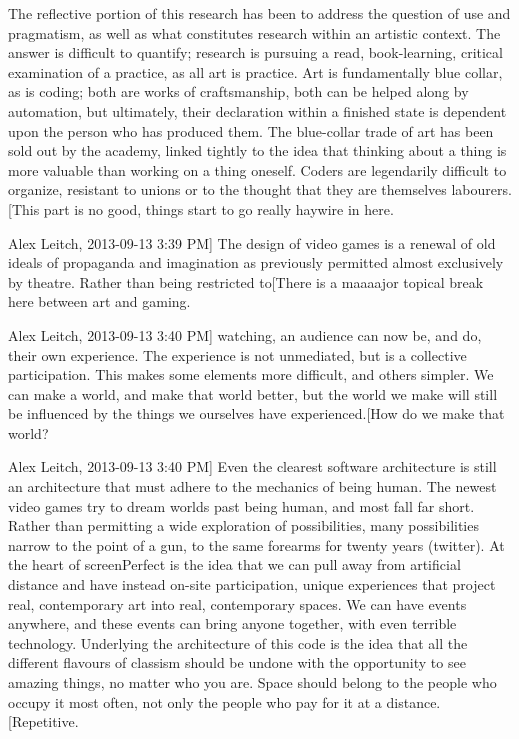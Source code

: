 The reflective portion of this research has been to address the question of use and pragmatism, as well as what constitutes research within an artistic context. The answer is difficult to quantify; research is pursuing a read, book-learning, critical examination of a practice, as all art is practice. Art is fundamentally blue collar, as is coding; both are works of craftsmanship, both can be helped along by automation, but ultimately, their declaration within a finished state is dependent upon the person who has produced them. The blue-collar trade of art has been sold out by the academy, linked tightly to the idea that thinking about a thing is more valuable than working on a thing oneself. Coders are legendarily difficult to organize, resistant to unions or to the thought that they are themselves labourers.[This part is no good, things start to go really haywire in here.

Alex Leitch, 2013-09-13 3:39 PM]
The design of video games is a renewal of old ideals of propaganda and imagination as previously permitted almost exclusively by theatre. Rather than being restricted to[There is a maaaajor topical break here between art and gaming.

Alex Leitch, 2013-09-13 3:40 PM] watching, an audience can now be, and do, their own experience. The experience is not unmediated, but is a collective participation. This makes some elements more difficult, and others simpler. We can make a world, and make that world better, but the world we make will still be influenced by the things we ourselves have experienced.[How do we make that world? 

Alex Leitch, 2013-09-13 3:40 PM] Even the clearest software architecture is still an architecture that must adhere to the mechanics of being human.
The newest video games try to dream worlds past being human, and most fall far short. Rather than permitting a wide exploration of possibilities, many possibilities narrow to the point of a gun, to the same forearms for twenty years (twitter). At the heart of screenPerfect is the idea that we can pull away from artificial distance and have instead on-site participation, unique experiences that project real, contemporary art into real, contemporary spaces. We can have events anywhere, and these events can bring anyone together, with even terrible technology. Underlying the architecture of this code is the idea that all the different flavours of classism should be undone with the opportunity to see amazing things, no matter who you are. Space should belong to the people who occupy it most often, not only the people who pay for it at a distance.
[Repetitive.

